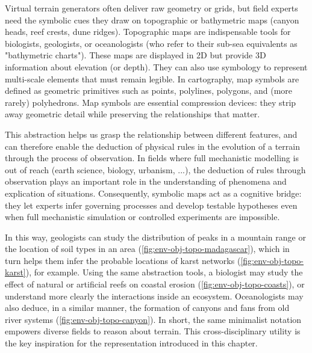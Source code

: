 Virtual terrain generators often deliver raw geometry or grids, but field experts need the symbolic cues they draw on topographic or bathymetric maps (canyon heads, reef crests, dune ridges). Topographic maps are indispensable tools for biologists, geologists, or oceanologists (who refer to their sub-sea equivalents as "bathymetric charts"). These maps are displayed in 2D but provide 3D information about elevation (or depth). They can also use symbology to represent multi-scale elements that must remain legible. In cartography, map symbols are defined as geometric primitives such as points, polylines, polygons, and (more rarely) polyhedrons. Map symbols are essential compression devices: they strip away geometric detail while preserving the relationships that matter.

This abstraction helps us grasp the relationship between different features, and can therefore enable the deduction of physical rules in the evolution of a terrain through the process of observation. In fields where full mechanistic modelling is out of reach (earth science, biology, urbanism, ...), the deduction of rules through observation plays an important role in the understanding of phenomena and explication of situations. Consequently, symbolic maps act as a cognitive bridge: they let experts infer governing processes and develop testable hypotheses even when full mechanistic simulation or controlled experiments are impossible. 

In this way, geologists can study the distribution of peaks in a mountain range or the location of soil types in an area (\cref{fig:env-obj-topo-madagascar}), which in turn helps them infer the probable locations of karst networks (\cref{fig:env-obj-topo-karst}), for example. Using the same abstraction tools, a biologist may study the effect of natural or artificial reefs on coastal erosion (\cref{fig:env-obj-topo-coasts}), or understand more clearly the interactions inside an ecosystem. Oceanologists may also deduce, in a similar manner, the formation of canyons and fans from old river systems (\cref{fig:env-obj-topo-canyon}). In short, the same minimalist notation empowers diverse fields to reason about terrain. This cross-disciplinary utility is the key inspiration for the  representation introduced in this chapter.

